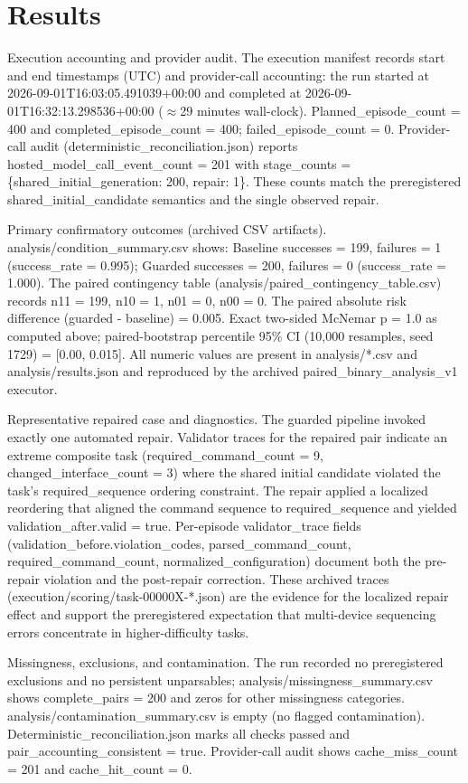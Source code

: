 \documentclass[conference]{IEEEtran}
\begin{document}
\section{Results}
Execution accounting and provider audit. The execution manifest records start and end timestamps (UTC) and provider-call accounting: the run started at 2026-09-01T16:03:05.491039+00:00 and completed at 2026-09-01T16:32:13.298536+00:00 (\ensuremath{\approx}29 minutes wall-clock). Planned\_episode\_count = 400 and completed\_episode\_count = 400; failed\_episode\_count = 0. Provider-call audit (deterministic\_reconciliation.json) reports hosted\_model\_call\_event\_count = 201 with stage\_counts = \{shared\_initial\_generation: 200, repair: 1\}. These counts match the preregistered shared\_initial\_candidate semantics and the single observed repair.

Primary confirmatory outcomes (archived CSV artifacts). analysis/condition\_summary.csv shows: Baseline successes = 199, failures = 1 (success\_rate = 0.995); Guarded successes = 200, failures = 0 (success\_rate = 1.000). The paired contingency table (analysis/paired\_contingency\_table.csv) records n11 = 199, n10 = 1, n01 = 0, n00 = 0. The paired absolute risk difference (guarded - baseline) = 0.005. Exact two-sided McNemar p = 1.0 as computed above; paired-bootstrap percentile 95\% CI (10,000 resamples, seed 1729) = [0.00, 0.015]. All numeric values are present in analysis/*.csv and analysis/results.json and reproduced by the archived paired\_binary\_analysis\_v1 executor.

Representative repaired case and diagnostics. The guarded pipeline invoked exactly one automated repair. Validator traces for the repaired pair indicate an extreme composite task (required\_command\_count = 9, changed\_interface\_count = 3) where the shared initial candidate violated the task's required\_sequence ordering constraint. The repair applied a localized reordering that aligned the command sequence to required\_sequence and yielded validation\_after.valid = true. Per-episode validator\_trace fields (validation\_before.violation\_codes, parsed\_command\_count, required\_command\_count, normalized\_configuration) document both the pre-repair violation and the post-repair correction. These archived traces (execution/scoring/task-00000X-*.json) are the evidence for the localized repair effect and support the preregistered expectation that multi-device sequencing errors concentrate in higher-difficulty tasks.

Missingness, exclusions, and contamination. The run recorded no preregistered exclusions and no persistent unparsables; analysis/missingness\_summary.csv shows complete\_pairs = 200 and zeros for other missingness categories. analysis/contamination\_summary.csv is empty (no flagged contamination). Deterministic\_reconciliation.json marks all checks passed and pair\_accounting\_consistent = true. Provider-call audit shows cache\_miss\_count = 201 and cache\_hit\_count = 0.
\end{document}
